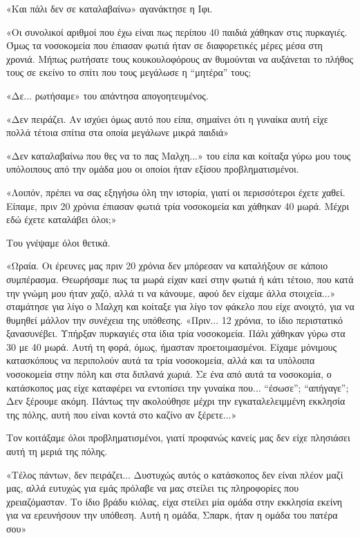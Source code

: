 \documentclass[12pt,twoside, openany]{book}
\begin{document}
«Και πάλι δεν σε καταλαβαίνω» αγανάκτησε η Ιφι.

«Οι συνολικοί αριθμοί που έχω είναι πως περίπου 40 παιδιά χάθηκαν στις πυρκαγιές. Όμως τα νοσοκομεία που έπιασαν φωτιά ήταν σε διαφορετικές μέρες μέσα στη χρονιά. Μήπως ρωτήσατε τους κουκουλοφόρους αν θυμούνται να αυξάνεται το πλήθος τους σε εκείνο το σπίτι που τους μεγάλωσε η “μητέρα” τους;

«Δε... ρωτήσαμε» του απάντησα απογοητευμένος.

«Δεν πειράζει. Αν ισχύει όμως αυτό που είπα, σημαίνει ότι η γυναίκα αυτή είχε πολλά τέτοια σπίτια στα οποία μεγάλωνε μικρά παιδιά»

«Δεν καταλαβαίνω που θες να το πας Μαλχη...» του είπα και κοίταξα γύρω μου τους υπόλοιπους από την ομάδα μου οι οποίοι ήταν εξίσου προβληματισμένοι.

«Λοιπόν, πρέπει να σας εξηγήσω όλη την ιστορία, γιατί οι περισσότεροι έχετε χαθεί. Είπαμε, πριν 20 χρόνια έπιασαν φωτιά τρία νοσοκομεία και χάθηκαν 40 μωρά. Μέχρι εδώ έχετε καταλάβει όλοι;»

Του γνέψαμε όλοι θετικά.

«Ωραία. Οι έρευνες μας πριν 20 χρόνια δεν μπόρεσαν να καταλήξουν σε κάποιο συμπέρασμα. Θεωρήσαμε πως τα μωρά είχαν καεί στην φωτιά ή κάτι τέτοιο, που κατά την γνώμη μου ήταν χαζό, αλλά τι να κάνουμε, αφού δεν είχαμε άλλα στοιχεία...» σταμάτησε για λίγο ο Μαλχη και κοίταξε για λίγο τον φάκελο που είχε ανοιχτό, για να θυμηθεί μάλλον την συνέχεια της υπόθεσης. «Πριν... 12 χρόνια, το ίδιο περιστατικό ξανασυνέβει. Υπήρξαν πυρκαγιές στα ίδια τρία νοσοκομεία. Πάλι χάθηκαν γύρω στα 30 με 40 μωρά. Αυτή τη φορά, όμως, ήμασταν προετοιμασμένοι. Είχαμε μόνιμους κατασκόπους να περιπολούν αυτά τα τρία νοσοκομεία, αλλά και τα υπόλοιπα νοσοκομεία στην πόλη και στα διπλανά χωριά. Σε ένα από αυτά τα νοσοκομία, ο κατάσκοπος μας είχε καταφέρει να εντοπίσει την γυναίκα που... “έσωσε”; “απήγαγε”; Δεν ξέρουμε ακόμη. Πάντως την ακολούθησε μέχρι την εγκαταλελειμμένη εκκλησία της πόλης, αυτή που είναι κοντά στο καζίνο αν ξέρετε...»

Τον κοιτάξαμε όλοι προβληματισμένοι, γιατί προφανώς κανείς μας δεν είχε πλησιάσει αυτή τη μεριά της πόλης.

«Τέλος πάντων, δεν πειράζει... Δυστυχώς αυτός ο κατάσκοπος δεν είναι πλέον μαζί μας, αλλά ευτυχώς για εμάς πρόλαβε να μας στείλει τις πληροφορίες που χρειαζόμασταν. Το ίδιο βράδυ κιόλας, είχα στείλει μία ομάδα στην εκκλησία εκείνη για να ερευνήσουν την υπόθεση. Αυτή η ομάδα, Σπαρκ, ήταν η ομάδα του πατέρα σου»
\end{document}
